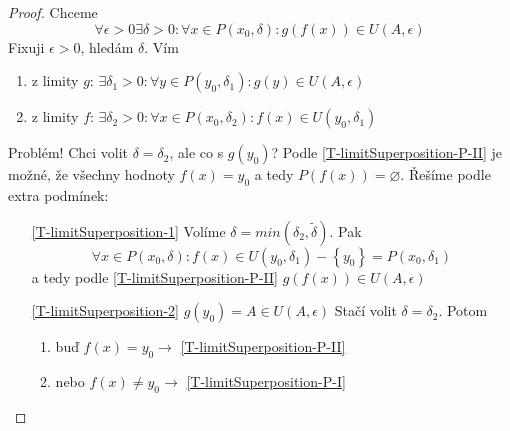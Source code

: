 \begin{proof}
    Chceme
    \begin{equation}
        \forall\epsilon>0\exists\delta>0:\forall x\in P(x_0,\delta):
            g\left(f(x)\right)\in U(A,\epsilon)
    \end{equation}
    Fixuji $\epsilon>0$, hledám $\delta$. Vím
    \begin{enumerate}[I]
        \item z limity $g$: $\exists\delta_1>0:\forall y\in P(y_0,\delta_1):
            g(y)\in U(A,\epsilon)$ \label{T-limitSuperposition-P-I}
        \item z limity $f$: $\exists\delta_2>0:\forall x\in P(x_0,\delta_2):
            f(x)\in U(y_0,\delta_1)$ \label{T-limitSuperposition-P-II}
    \end{enumerate}
    Problém! Chci volit $\delta=\delta_2$, ale co s $g(y_0)$? Podle \autoref{T-limitSuperposition-P-II}
    je možné, že všechny hodnoty $f(x)=y_0$ a tedy $P(f(x))=\varnothing$. Řešíme podle extra
    podmínek:
    \begin{enumerate}
        \item[\autoref{T-limitSuperposition-1}] Volíme $\delta=min(\delta_2,\tilde{\delta})$. Pak
            \begin{equation}
                \forall x\in P(x_0,\delta):f(x)\in U(y_0,\delta_1)-\left\{y_0\right\}=P(x_0,\delta_1)
            \end{equation}
            a tedy podle \autoref{T-limitSuperposition-P-II} $g\left(f(x)\right)\in U(A,\epsilon)$
        \item[\autoref{T-limitSuperposition-2}] $g(y_0)=A\in U(A,\epsilon)$ Stačí volit
            $\delta=\delta_2$. Potom
            \begin{enumerate}
                \item buď $f(x)=y_0 \rightarrow$ \autoref{T-limitSuperposition-P-II}
                \item nebo $f(x)\neq y_0 \rightarrow$ \autoref{T-limitSuperposition-P-I}
            \end{enumerate}
    \end{enumerate}
\end{proof}
